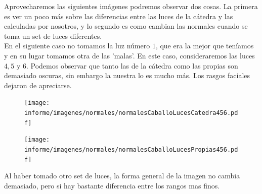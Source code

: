 Aprovecharemos las siguientes imágenes podremos observar dos cosas. La primera es ver un poco más sobre las diferencias entre las luces de la cátedra y las calculadas por nosotros, y lo segundo es como cambian las normales cuando se toma un set de luces diferentes. \\

En el siguiente caso no tomamos la luz número $1$, que era la mejor que teníamos y en su lugar tomamos otra de las 'malas'. En este caso, consideraremos las luces $4, 5$ y $6$. Podemos observar que tanto las de la cátedra como las propias son demasiado oscuras, sin embargo la nuestra lo es mucho más. Los rasgos faciales dejaron de apreciarse. \\

\begin{figure}[H]
\centering
\begin{minipage}{.5\textwidth}
    \centering
        \texttt{[image: informe/imagenes/normales/normalesCaballoLucesCatedra456.pdf]}
\end{minipage}%
\begin{minipage}{.5\textwidth}
    \centering
        \texttt{[image: informe/imagenes/normales/normalesCaballoLucesPropias456.pdf]} \\
\end{minipage}
\end{figure}

Al haber tomado otro set de luces, la forma general de la imagen no cambia demasiado, pero si hay bastante diferencia entre los rangos mas finos.

